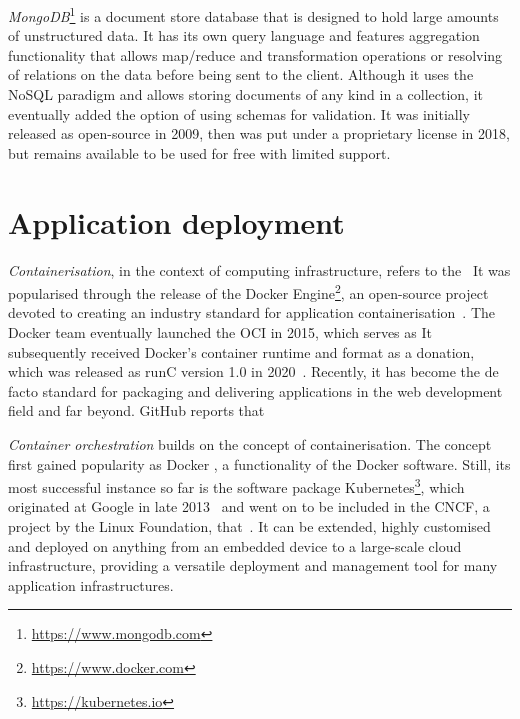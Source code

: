 \emph{MongoDB}\footnote{\url{https://www.mongodb.com}} is a document store database that is designed to hold large amounts of unstructured data.
It has its own query language and features aggregation functionality that allows map/reduce and transformation operations or resolving of relations on the data before being sent to the client.
Although it uses the \ac{NoSQL} paradigm and allows storing documents of any kind in a collection, it eventually added the option of using schemas for validation.
It was initially released as open-source in 2009, then was put under a proprietary license in 2018, but remains available to be used for free with limited support.

\section{Application deployment}
\label{sec:application-deployment}

\emph{Containerisation}, in the context of computing infrastructure, refers to the~ It was popularised through the release of the Docker Engine\footnote{\url{https://www.docker.com}}, an open-source project devoted to creating an industry standard for application containerisation~\parencite{dockerRelease}.
The Docker team eventually launched the \ac{OCI} in 2015, which serves as  It subsequently received Docker's container runtime and format as a donation, which was released as runC version 1.0 in 2020~\parencite{openContainerInitiative}.
Recently, it has become the de facto standard for packaging and delivering applications in the web development field and far beyond.
GitHub reports that~

\emph{Container orchestration} builds on the concept of containerisation.  The concept first gained popularity as Docker , a functionality of the Docker software. Still, its most successful instance so far is the software package Kubernetes\footnote{\url{https://kubernetes.io}}, which originated at Google in late 2013~\parencite{kubernetesHistory} and went on to be included in the \ac{CNCF}, a project by the Linux Foundation, that~.
It can be extended, highly customised and deployed on anything from an embedded device to a large-scale cloud infrastructure, providing a versatile deployment and management tool for many application infrastructures.
